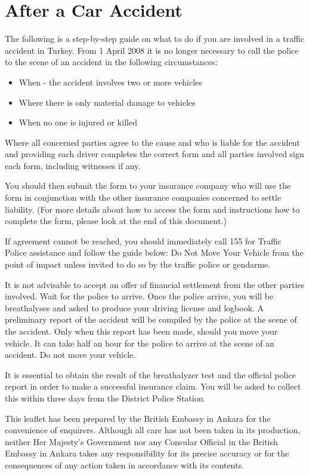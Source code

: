 \section{After a Car Accident}
The following is a step-by-step guide on what to do if you are involved in a traffic accident in Turkey.
From 1 April 2008 it is no longer necessary to call the police to the scene of an accident in the following circumstances:

\begin{itemize}
\item When - the accident involves two or more vehicles
\item Where there is only material damage to vehicles
\item When no one is injured or killed
\end{itemize}

Where all concerned parties agree to the cause and who is liable for the accident and providing each driver completes the correct form and all parties involved sign each form, including witnesses if any. 

You should then submit the form to your insurance company who will use the form in conjunction with the other insurance companies concerned to settle liability. (For more details about how to access the form and instructions how to complete the form, please look at the end of this document.)

If agreement cannot be reached, you should immediately call 155 for Traffic Police assistance and follow the guide below:
Do Not Move Your Vehicle from the point of impact unless invited to do so by the traffic police or gendarme.

It is not advisable to accept an offer of financial settlement from the other parties involved. Wait for the police to arrive.
Once the police arrive, you will be breathalyses and asked to produce your driving license and logbook. A preliminary report of the accident will be compiled by the police at the scene of the accident. Only when this report has been made, should you move your vehicle.  It can take half an hour for the police to arrive at the scene of an accident. Do not move your vehicle.

It is essential to obtain the result of the breathalyzer test and the official police report in order to make a successful insurance claim. You will be asked to collect this within three days from the District Police Station.

This leaflet has been prepared by the British Embassy in Ankara for the convenience of enquirers.  Although all care has not been taken in its production, neither Her Majesty's Government nor any Consular Official in the British Embassy in Ankara takes any responsibility for its precise accuracy or for the consequences of any action taken in accordance with its contents.